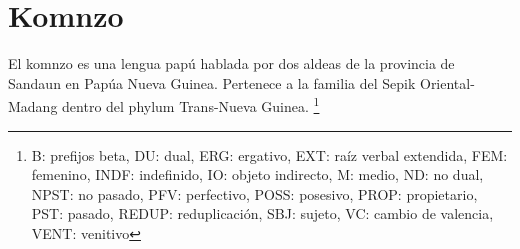 \section*{Komnzo}

\noindent El komnzo es una lengua papú hablada por dos aldeas de la provincia de Sandaun en Papúa Nueva Guinea. Pertenece a la familia del Sepik Oriental-Madang dentro del phylum Trans-Nueva Guinea. 
\footnote{B: prefijos beta, DU: dual, ERG: ergativo, EXT: raíz verbal extendida, FEM: femenino, INDF: indefinido, IO: objeto indirecto, M: medio, ND: no dual, NPST: no pasado, PFV: perfectivo, POSS: posesivo, PROP: propietario, PST: pasado, REDUP: reduplicación, SBJ: sujeto, VC: cambio de valencia, VENT: venitivo}
\vspace{0.5cm}

